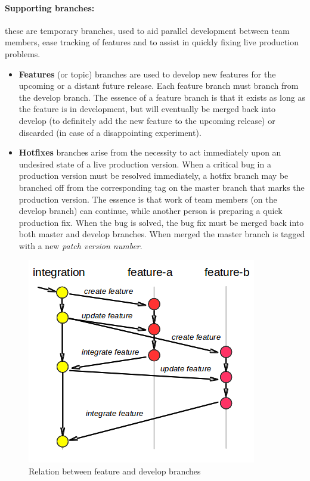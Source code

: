\documentclass[12pt,a4paper]{article}
\begin{document}
\paragraph{Supporting branches:} these are temporary branches, used to aid parallel development between team members, ease tracking of features and to assist in quickly fixing live production problems.
\begin{itemize}
\item \textbf{Features} (or topic) branches are  used to develop new features for the upcoming or a distant future release. Each feature branch must branch from the develop branch. The essence of a feature branch is that it exists as long as the feature is in development, but will eventually be merged back into develop (to definitely add the new feature to the upcoming release) or discarded (in case of a disappointing experiment).
\item \textbf{Hotfixes} branches arise from the necessity to act immediately upon an undesired state of a live production version. When a critical bug in a production version must be resolved immediately, a hotfix branch may be branched off from the corresponding tag on the master branch that marks the production version. The essence is that work of team members (on the develop branch) can continue, while another person is preparing a quick production fix. When the bug is solved, the bug fix must be merged back into both master and develop branches. When merged the master branch is tagged with a new \textit{patch version number}.
\end{itemize}

\begin{figure}
\center
\includegraphics[scale=0.6]{images/feature_branching.png}
\caption{Relation between feature and develop branches}
\end{figure}
\end{document}
